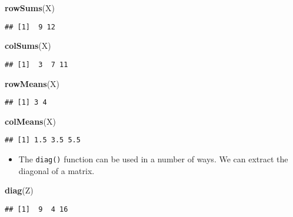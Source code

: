 \documentclass[]{book}
\newenvironment{Shaded}{\begin{snugshade}}{\end{snugshade}}
\newcommand{\KeywordTok}[1]{\textcolor[rgb]{0.13,0.29,0.53}{\textbf{#1}}}
\newcommand{\NormalTok}[1]{#1}
\providecommand{\tightlist}{%
  \setlength{\itemsep}{0pt}\setlength{\parskip}{0pt}}
\begin{document}
\begin{Shaded}
\begin{Highlighting}[]
\KeywordTok{rowSums}\NormalTok{(X)}
\end{Highlighting}
\end{Shaded}

\begin{verbatim}
## [1]  9 12
\end{verbatim}

\begin{Shaded}
\begin{Highlighting}[]
\KeywordTok{colSums}\NormalTok{(X)}
\end{Highlighting}
\end{Shaded}

\begin{verbatim}
## [1]  3  7 11
\end{verbatim}

\begin{Shaded}
\begin{Highlighting}[]
\KeywordTok{rowMeans}\NormalTok{(X)}
\end{Highlighting}
\end{Shaded}

\begin{verbatim}
## [1] 3 4
\end{verbatim}

\begin{Shaded}
\begin{Highlighting}[]
\KeywordTok{colMeans}\NormalTok{(X)}
\end{Highlighting}
\end{Shaded}

\begin{verbatim}
## [1] 1.5 3.5 5.5
\end{verbatim}

\begin{itemize}
\tightlist
\item
  The \texttt{diag()} function can be used in a number of ways. We can extract the diagonal of a matrix.
\end{itemize}

\begin{Shaded}
\begin{Highlighting}[]
\KeywordTok{diag}\NormalTok{(Z)}
\end{Highlighting}
\end{Shaded}

\begin{verbatim}
## [1]  9  4 16
\end{verbatim}
\end{document}
